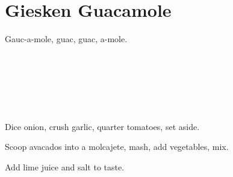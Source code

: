 \section[Guacamole]{Giesken Guacamole}


\begin{recipestats}[
	servings=8,
	preptime=10~\minute,
	source=The Giesken Family,
]
\end{recipestats}

\begin{recipeabstract}
	Gauc-a-mole, guac, guac, a-mole.
\end{recipeabstract}


\begin{ingredientcolumns}[1]
	\begin{ingredientblock}
		\\
		\\
		\\
		\\
		\\
	\end{ingredientblock}
\end{ingredientcolumns}


\begin{preparation}
	\item Dice onion, crush garlic, quarter tomatoes, set aside.
	\item Scoop avacados into a molcajete, mash, add vegetables, mix.
	\item Add lime juice and salt to taste.
\end{preparation}


\recipeend%
